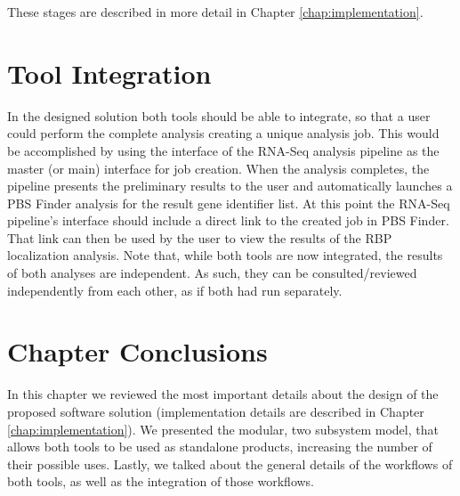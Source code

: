 These stages are described in more detail in Chapter \ref{chap:implementation}.

\section{Tool Integration}


In the designed solution both tools should be able to integrate, so that a user
could perform the complete analysis creating a unique analysis job. This would
be accomplished by using the interface of the RNA-Seq analysis pipeline as the
master (or main) interface for job creation. When the analysis completes, the
pipeline presents the preliminary results to the user and automatically launches
a PBS Finder analysis for the result gene identifier list. At this point the
RNA-Seq pipeline's interface should include a direct link to the created job in
PBS Finder. That link can then be used by the user to view the results of the
RBP localization analysis. Note that, while both tools are now integrated, the
results of both analyses are independent. As such, they can be
consulted/reviewed independently from each other, as if both had run separately.

\section{Chapter Conclusions}


In this chapter we reviewed the most important details about the design of the
proposed software solution (implementation details are described in Chapter
\ref{chap:implementation}). We presented the modular, two subsystem model, that
allows both tools to be used as standalone products, increasing the number of
their possible uses. Lastly, we talked about the general details of the
workflows of both tools, as well as the integration of those workflows.
